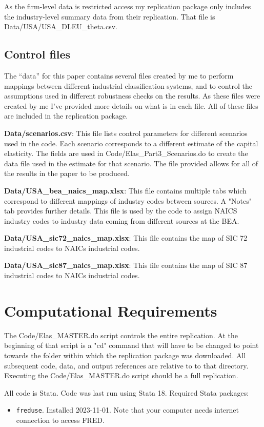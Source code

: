 \documentclass[11pt]{article}
\begin{document}
As the firm-level data is restricted access my replication package only includes the industry-level summary data from their replication. That file is Data/USA/USA\_DLEU\_theta.csv. 

\subsection{Control files}
The ``data'' for this paper contains several files created by me to perform mappings between different industrial classification systems, and to control the assumptions used in different robustness checks on the results. As these files were created by me I've provided more details on what is in each file. All of these files are included in the replication package.

\textbf{Data/scenarios.csv}: This file lists control parameters for different scenarios used in the code. Each scenario corresponds to a different estimate of the capital elasticity. The fields are used in Code/Elas\_Part3\_Scenarios.do to create the data file used in the estimate for that scenario. The file provided allows for all of the results in the paper to be produced. 

\textbf{Data/USA\_bea\_naics\_map.xlsx}: This file contains multiple tabs which correspond to different mappings of industry codes between sources. A "Notes" tab provides further details. This file is used by the code to assign NAICS industry codes to industry data coming from different sources at the BEA.

\textbf{Data/USA\_sic72\_naics\_map.xlsx}: This file contains the map of SIC 72 industrial codes to NAICs industrial codes. 

\textbf{Data/USA\_sic87\_naics\_map.xlsx}: This file contains the map of SIC 87 industrial codes to NAICs industrial codes. 

\section{Computational Requirements}
The Code/Elas\_MASTER.do script controls the entire replication. At the beginning of that script is a "cd" command that will have to be changed to point towards the folder within which the replication package was downloaded. All subsequent code, data, and output references are relative to to that directory. Executing the Code/Elas\_MASTER.do script should be a full replication.

All code is Stata. Code was last run using Stata 18. Required Stata packages:
\begin{itemize}
	\item \texttt{freduse}. Installed 2023-11-01. Note that your computer needs internet connection to access FRED.
\end{itemize}
\end{document}
